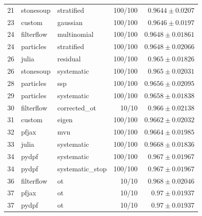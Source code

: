 \begin{table}[!htbp]
\begin{tabular}{rllrr}
21 & stonesoup & stratified & 100/100 & $0.9644 \pm 0.0207$ \\
23 & custom & gaussian & 100/100 & $0.9646 \pm 0.0197$ \\
24 & filterflow & multinomial & 100/100 & $0.9648 \pm 0.01861$ \\
24 & particles & stratified & 100/100 & $0.9648 \pm 0.02066$ \\
26 & julia & residual & 100/100 & $0.965 \pm 0.01826$ \\
26 & stonesoup & systematic & 100/100 & $0.965 \pm 0.02031$ \\
28 & particles & ssp & 100/100 & $0.9656 \pm 0.02095$ \\
29 & particles & systematic & 100/100 & $0.9658 \pm 0.01838$ \\
30 & filterflow & corrected\_ot & 10/10 & $0.966 \pm 0.02138$ \\
31 & custom & eigen & 100/100 & $0.9662 \pm 0.02032$ \\
32 & pfjax & mvn & 100/100 & $0.9664 \pm 0.01985$ \\
33 & julia & systematic & 100/100 & $0.9668 \pm 0.01836$ \\
34 & pydpf & systematic & 100/100 & $0.967 \pm 0.01967$ \\
34 & pydpf & systematic\_stop & 100/100 & $0.967 \pm 0.01967$ \\
36 & filterflow & ot & 10/10 & $0.968 \pm 0.02046$ \\
37 & pfjax & ot & 10/10 & $0.97 \pm 0.01937$ \\
37 & pydpf & ot & 10/10 & $0.97 \pm 0.01937$ \\
\bottomrule
\end{tabular}
\end{table}


